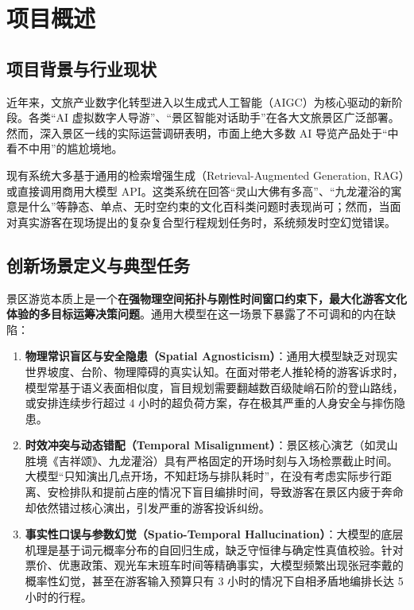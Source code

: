 \documentclass[11pt,a4paper]{ctexart}
\begin{document}
\newpage
\tableofcontents
\newpage


\section{项目概述}

\subsection{项目背景与行业现状}
近年来，文旅产业数字化转型进入以生成式人工智能（AIGC）为核心驱动的新阶段。各类“AI 虚拟数字人导游”、“景区智能对话助手”在各大文旅景区广泛部署。然而，深入景区一线的实际运营调研表明，市面上绝大多数 AI 导览产品处于“中看不中用”的尴尬境地。

现有系统大多基于通用的检索增强生成（Retrieval-Augmented Generation, RAG）或直接调用商用大模型 API。这类系统在回答“灵山大佛有多高”、“九龙灌浴的寓意是什么”等静态、单点、无时空约束的文化百科类问题时表现尚可；然而，当面对真实游客在现场提出的复杂复合型行程规划任务时，系统频发时空幻觉错误。

\subsection{创新场景定义与典型任务}
景区游览本质上是一个\textbf{在强物理空间拓扑与刚性时间窗口约束下，最大化游客文化体验的多目标运筹决策问题}。通用大模型在这一场景下暴露了不可调和的内在缺陷：

\begin{enumerate}[label=\textbf{\arabic*.}]
    \item \textbf{物理常识盲区与安全隐患（Spatial Agnosticism）}：通用大模型缺乏对现实世界坡度、台阶、物理障碍的真实认知。在面对带老人推轮椅的游客诉求时，模型常基于语义表面相似度，盲目规划需要翻越数百级陡峭石阶的登山路线，或安排连续步行超过 4 小时的超负荷方案，存在极其严重的人身安全与摔伤隐患。
    \item \textbf{时效冲突与动态错配（Temporal Misalignment）}：景区核心演艺（如灵山胜境《吉祥颂》、九龙灌浴）具有严格固定的开场时刻与入场检票截止时间。大模型“只知演出几点开场，不知赶场与排队耗时”，在没有考虑实际步行距离、安检排队和提前占座的情况下盲目编排时间，导致游客在景区内疲于奔命却依然错过核心演出，引发严重的游客投诉纠纷。
    \item \textbf{事实性口误与参数幻觉（Spatio-Temporal Hallucination）}：大模型的底层机理是基于词元概率分布的自回归生成，缺乏守恒律与确定性真值校验。针对票价、优惠政策、观光车末班车时间等精确事实，大模型频繁出现张冠李戴的概率性幻觉，甚至在游客输入预算只有 3 小时的情况下自相矛盾地编排长达 5 小时的行程。
\end{enumerate}
\end{document}
